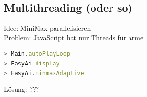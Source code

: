 \documentclass[12pt]{beamer}
\begin{document}
\subsection{Multithreading (oder so)}
\begin{frame}[fragile]
	Idee: MiniMax parallelisieren
	\pause
	\\Problem: JavaScript hat nur Threads für arme
	\pause
	\begin{lstlisting}[language=JavaScript]
> Main.autoPlayLoop
> EasyAi.display
> EasyAi.minmaxAdaptive
	\end{lstlisting}
	\pause
	Lösung: ???
\end{frame}
\end{document}
